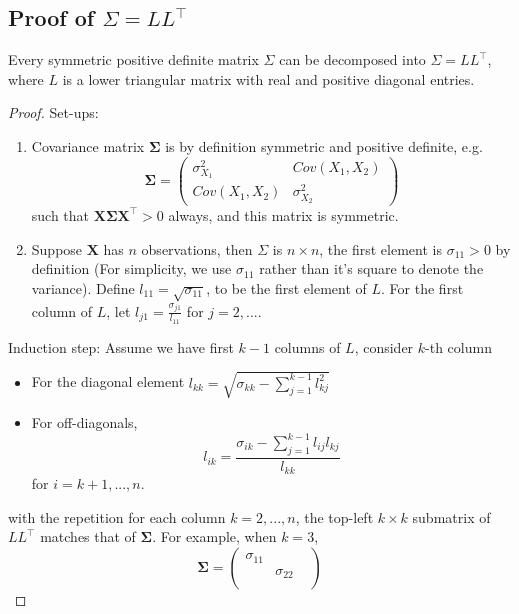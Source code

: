 \documentclass[preprint,12pt]{elsarticle}
\begin{document}
\subsection{Proof of $\Sigma=LL^{\top}$}
Every symmetric positive definite matrix $\Sigma$ can be decomposed into $\Sigma=LL^{\top}$, where $L$ is a lower triangular matrix with real and positive diagonal entries. 
\begin{proof}
    Set-ups:
\begin{enumerate}
    \item Covariance matrix $\boldsymbol{\Sigma}$ is by definition symmetric and positive definite, e.g.
    \begin{equation}
        \boldsymbol{\Sigma}=\begin{pmatrix}
            \sigma_{X_1}^2 & Cov(X_1,X_2)\\
            Cov(X_1,X_2) & \sigma_{X_2}^2
        \end{pmatrix}
    \end{equation}
    such that $\mathbf{X}\boldsymbol{\Sigma} \mathbf{X}^{\top}>0$ always, and this matrix is symmetric.
    \item Suppose $\mathbf{X}$ has $n$ observations, then $\Sigma$ is $n\times n$, the first element is $\sigma_{11}>0$ by definition (For simplicity, we use $\sigma_{11}$ rather than it's square to denote the variance). Define $l_{11}=\sqrt{\sigma_{11}}$, to be the first element of $L$. For the first column of $L$, let $l_{j1}=\frac{\sigma_{j1}}{l_{11}}$ for $j=2,...$.
\end{enumerate}
Induction step: Assume we have first $k-1$ columns of $L$, consider $k$-th column
\begin{itemize}
    \item For the diagonal element $l_{kk}=\sqrt{\sigma_{kk}-\sum_{j=1}^{k-1}l_{kj}^2}$
    \item For off-diagonals, 
    \begin{equation}
        l_{ik}=\frac{\sigma_{ik}-\sum_{j=1}^{k-1}l_{ij}l_{kj}}{l_{kk}}
    \end{equation}
    for $i=k+1,...,n$.
\end{itemize}
with the repetition for each column $k=2,...,n$, the top-left $k\times k$ submatrix of $LL^{\top}$ matches that of $\boldsymbol{\Sigma}$. For example, when $k=3$, 
\begin{equation}
    \boldsymbol{\Sigma}=
        \begin{pmatrix}
            \sigma_{11} & & \\
             & \sigma_{22} & \\

\end{pmatrix}
\end{equation}
\end{proof}
\end{document}
